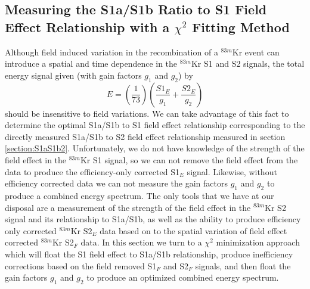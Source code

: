 \subsection{Measuring the S1a/S1b Ratio to S1 Field Effect Relationship with a $\chi^2$ Fitting Method} \label{section:S1relation2}

Although field induced variation in the recombination of a $^{83m}$Kr event can introduce a spatial and time dependence in the $^{83m}$Kr S1 and S2 signals, the total energy signal given (with gain factors $g_1$ and $g_2$) by 
\begin{equation} \label{CombinedEnergy}
E=\left(\frac{1}{73}\right)\left(\frac{S1_E}{g_1} + \frac{S2_E}{g_2}\right)
\end{equation}
should be insensitive to field variations.  We can take advantage of this fact to determine the optimal S1a/S1b to S1 field effect relationship corresponding to the directly measured S1a/S1b to S2 field effect relationship measured in section \ref{section:S1aS1b2}.  Unfortunately, we do not have knowledge of the strength of the field effect in the $^{83m}$Kr S1 signal, so we can not remove the field effect from the data to produce the efficiency-only corrected S1$_E$ signal.  Likewise, without efficiency corrected data we can not measure the gain factors $g_1$ and $g_2$ to produce a combined energy spectrum.  The only tools that we have at our disposal are a measurement of the strength of the field effect in the $^{83m}$Kr S2 signal and its relationship to S1a/S1b, as well as the ability to produce efficiency only corrected $^{83m}$Kr S2$_E$ data based on to the spatial variation of field effect corrected  $^{83m}$Kr S2$_F$ data.  In this section we turn to a $\chi^2$ minimization approach which will float the S1 field effect to S1a/S1b relationship, produce inefficiency corrections based on the field removed S1$_F$ and S2$_F$ signals, and then float the gain factors $g_1$ and $g_2$ to produce an optimized combined energy spectrum.  

